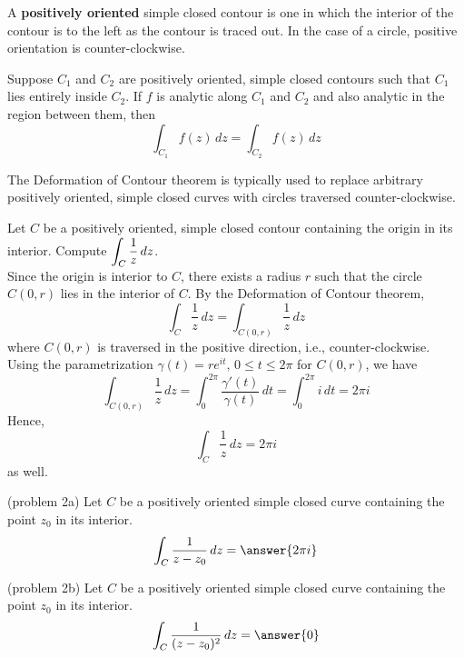 \documentclass[handout]{ximera}
\begin{document}
A \textbf{positively oriented} simple closed contour is one in which the interior of the contour is to the left as the contour is traced out.
In the case of a circle, positive orientation is counter-clockwise. 

\begin{theorem}
Suppose $C_1$ and $C_2$ are positively oriented, simple closed contours such that $C_1$ lies entirely inside $C_2$. If $f$ is analytic 
along $C_1$ and $C_2$ and also analytic in the region between them, then
\[
\int_{C_1} f(z) \, dz = \int_{C_2} f(z) \, dz
\]
\end{theorem}

\begin{remark} 
The Deformation of Contour theorem is typically used to replace arbitrary positively oriented, simple closed curves with circles traversed counter-clockwise.
\end{remark}


\begin{example}[example 2]
Let $C$ be a positively oriented, simple closed contour containing the origin in its interior. Compute $\displaystyle \int_C \frac{1}{z} \, dz$.\\
Since the origin is interior to $C$, there exists a radius $r$ such that the circle $C(0, r)$ lies in the interior of $C$.
By the Deformation of Contour theorem,
\[
\int_C \frac{1}{z} \, dz = \int_{C(0,r)} \frac{1}{z} \, dz
\]
where $C(0,r)$ is traversed in the positive direction, i.e., counter-clockwise. Using the parametrization
$\gamma(t) = re^{it}, \, 0\leq t \leq 2\pi$ for $C(0, r)$, we have
\[
\int_{C(0,r)} \frac{1}{z} \, dz = \int_0^{2\pi} \frac{\gamma'(t)}{\gamma(t)} \, dt = \int_0^{2\pi} i \, dt = 2\pi i
\]
Hence, 
\[
\int_C \frac{1}{z} \, dz = 2\pi i
\]
as well.
\end{example}

\begin{problem}(problem 2a)
Let $C$ be a positively oriented simple closed curve containing the point $z_0$ in its interior.\\
\[
\int_C \frac{1}{z-z_0} \, dz = \answer{2\pi i}
\]
\end{problem}

\begin{problem}(problem 2b)
Let $C$ be a positively oriented simple closed curve containing the point $z_0$ in its interior.\\
\[
\int_C \frac{1}{(z-z_0)^2} \, dz = \answer{0}
\]
\end{problem}
\end{document}
